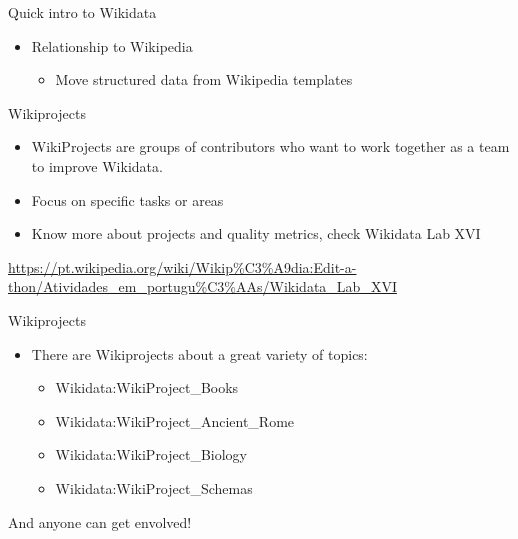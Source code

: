 \documentclass{beamer}
\begin{document}
\begin{frame}{Quick intro to Wikidata}

\begin{itemize}
    \item Relationship to Wikipedia
    
    \begin{itemize}
        \item Move structured data from Wikipedia templates 
    \end{itemize}
    
\end{itemize}

\end{frame}


\begin{frame}{Wikiprojects}

\begin{itemize}
    \item WikiProjects are groups of contributors who want to work together as a team to improve Wikidata.
    \item Focus on specific tasks or areas
    \item Know more about projects and quality metrics, check Wikidata Lab XVI 
    
\end{itemize}
\vskip 3cm
\url{https://pt.wikipedia.org/wiki/Wikip\%C3\%A9dia:Edit-a-thon/Atividades_em_portugu\%C3\%AAs/Wikidata_Lab_XVI}

\end{frame}


\begin{frame}{Wikiprojects}

\begin{itemize}
    \item There are Wikiprojects about a great variety of topics:
    \begin{itemize}
        \item Wikidata:WikiProject\_Books
        \item Wikidata:WikiProject\_Ancient\_Rome
        \item Wikidata:WikiProject\_Biology
        \item Wikidata:WikiProject\_Schemas
    \end{itemize}
\vskip 1cm
\end{itemize}
And anyone can get envolved!

\end{frame}
\end{document}
